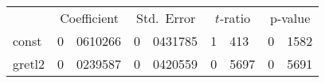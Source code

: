 \begin{tabular}{lr@{.}lr@{.}lr@{.}lr@{.}l}
  &
 \multicolumn{2}{c}{Coefficient} &
  \multicolumn{2}{c}{Std.\ Error} &
   \multicolumn{2}{c}{$t$-ratio} &
    \multicolumn{2}{c}{p-value} \\[1ex]
const &
  0&0610266 &
    0&0431785 &
      1&413 &
        0&1582 \\
gretl2 &
  0&0239587 &
    0&0420559 &
      0&5697 &
        0&5691 \\
\end{tabular}
